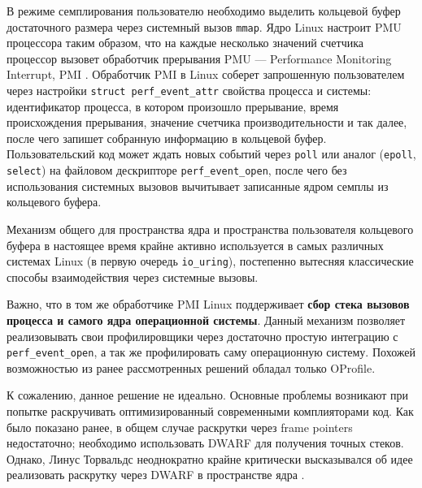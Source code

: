 В режиме семплирования пользователю необходимо выделить кольцевой буфер достаточного размера через системный вызов \verb!mmap!.
Ядро Linux настроит PMU процессора таким образом, что на каждые несколько значений счетчика процессор вызовет обработчик прерывания
PMU --- Performance Monitoring Interrupt, PMI \cite{linux:pmi}.
Обработчик PMI в Linux соберет запрошенную пользователем через настройки \verb!struct perf_event_attr! свойства процесса и системы:
идентификатор процесса, в котором произошло прерывание, время происхождения прерывания, значение счетчика производительности и так далее,
после чего запишет собранную информацию в кольцевой буфер. Пользовательский код может ждать новых событий через \verb!poll! 
или аналог (\verb!epoll!, \verb!select!) на файловом дескрипторе \verb!perf_event_open!, после чего без использования системных
вызовов вычитывает записанные ядром семплы из кольцевого буфера.

Механизм общего для пространства ядра и пространства пользователя кольцевого буфера в настоящее время крайне активно используется
в самых различных системах Linux (в первую очередь \lstinline!io_uring!),
постепенно вытесняя классические способы взаимодействия через системные вызовы.

Важно, что в том же обработчике PMI Linux поддерживает \textbf{сбор стека вызовов процесса и самого ядра операционной системы}.
Данный механизм позволяет реализовывать свои профилировщики через достаточно простую интеграцию с \verb!perf_event_open!,
а так же профилировать саму операционную систему. Похожей возможностью из ранее рассмотренных решений обладал только OProfile.

К сожалению, данное решение не идеально.
Основные проблемы возникают при попытке раскручивать оптимизированный современными комплияторами код.
Как было показано ранее, в общем случае раскрутки через frame pointers недостаточно;
необходимо использовать DWARF для получения точных стеков.
Однако, Линус Торвальдс неоднократно крайне критически высказывался об идее реализовать
раскрутку через DWARF в пространстве ядра \cite{dwarf:linus}.

